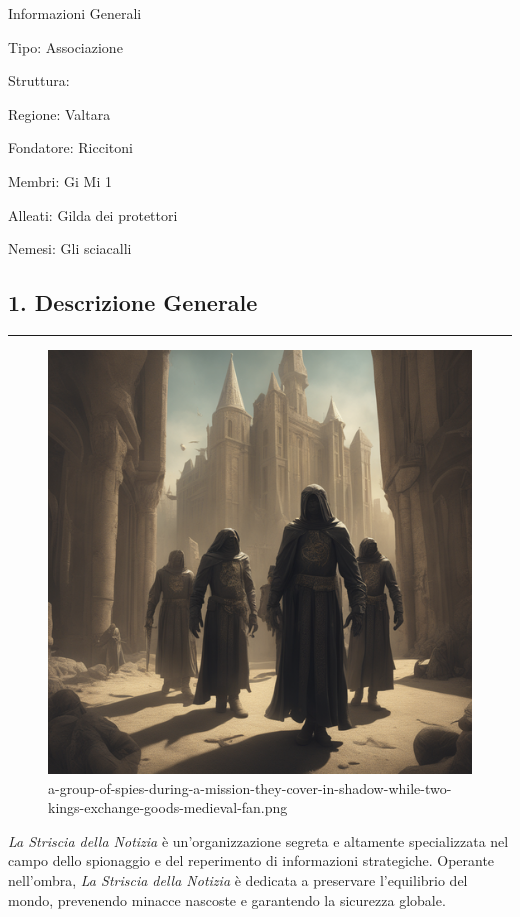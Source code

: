 Informazioni Generali

Tipo: Associazione

Struttura:

Regione: Valtara

Fondatore: Riccitoni

Membri: Gi Mi 1

Alleati: Gilda dei protettori

Nemesi: Gli sciacalli

\subsection{1. Descrizione Generale}\label{descrizione-generale}

\begin{center}\rule{0.5\linewidth}{0.5pt}\end{center}

\begin{figure}
\centering
\includegraphics{a-group-of-spies-during-a-mission-they-cover-in-shadow-while-two-kings-exchange-goods-medieval-fan.png}
\caption{a-group-of-spies-during-a-mission-they-cover-in-shadow-while-two-kings-exchange-goods-medieval-fan.png}
\end{figure}

\emph{La Striscia della Notizia} è un'organizzazione segreta e altamente
specializzata nel campo dello spionaggio e del reperimento di
informazioni strategiche. Operante nell'ombra, \emph{La Striscia della
Notizia} è dedicata a preservare l'equilibrio del mondo, prevenendo
minacce nascoste e garantendo la sicurezza globale.

